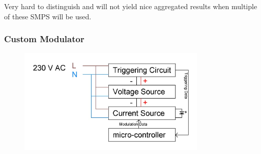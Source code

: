 \documentclass{beamer}
\begin{document}
\begin{frame}
		Very hard to distinguish and will not yield nice aggregated results when multiple of these SMPS will be used.
		
	\end{frame}





	\begin{frame}\frametitle{Custom Modulator}
		\begin{figure}
			\centering
			\includegraphics[width=0.8\textwidth]{../chapters/hardware-chapters/AC/ac-modulator/custom-hardware/ac-modulator-architectural.JPG}
		\end{figure}
	\end{frame}







\end{document}
